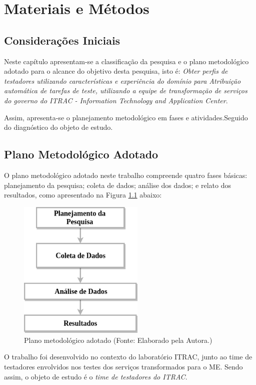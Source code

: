 \chapter{Materiais e Métodos}
\label{ch:metodologia}
\section{Considerações Iniciais}
Neste capítulo apresentam-se a classificação da pesquisa e o plano metodológico adotado para o alcance do objetivo desta pesquisa, isto é: \textit{Obter perfis de testadores utilizando características e experiência do domínio para Atribuição automática de tarefas de teste, utilizando a equipe de transformação de serviços do governo do ITRAC - Information Technology and Application Center}.

Assim, apresenta-se o planejamento metodológico em fases e atividades.Seguido do diagnóstico do objeto de estudo.

\section{Plano Metodológico Adotado}
\label{sec:planMetodologico}

O plano metodológico adotado neste trabalho compreende quatro fases básicas: planejamento da pesquisa; coleta de dados; análise dos dados; e relato dos resultados, como apresentado  na Figura \ref{fig:PlanoGeral} abaixo:

        \begin{figure}[H]
          \centering
          \includegraphics[width=6cm]{figuras/planoGeral.png}
          \caption{Plano metodológico adotado (Fonte: Elaborado pela Autora.)}
          \label{fig:PlanoGeral}

        \end{figure}

O trabalho foi desenvolvido no contexto do laboratório ITRAC, junto ao time de testadores envolvidos nos testes dos serviços transformados para o ME. Sendo assim, o objeto de estudo é o\textit{ time de testadores do ITRAC}.

